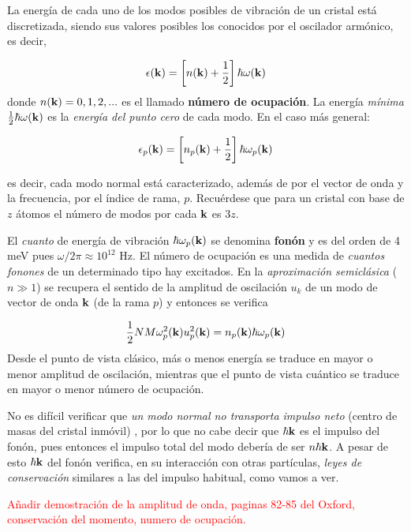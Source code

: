 La energía de cada uno de los modos posibles de vibración de un cristal está discretizada, siendo sus valores posibles los conocidos por el oscilador armónico, es decir,

\begin{equation}
    \epsilon (\mathbf{k}) = \left[ n(\mathbf{k}) + \frac{1}{2} \right] \hbar \omega (\mathbf{k})
\end{equation}
donde $n(\mathbf{k})=0,1,2,...$ es el llamado \textbf{número de ocupación}. La energía \textit{mínima} $\frac{1}{2} \hbar \omega (\mathbf{k})$ es la \textit{energía del punto cero} de cada modo. En el caso más general:
 
 \begin{mybox}
\begin{equation}
    \epsilon_p (\mathbf{k}) = \left[ n_p(\mathbf{k}) + \frac{1}{2} \right] \hbar \omega_p ( \mathbf{k})
\end{equation}
\end{mybox}
es decir, cada modo normal está caracterizado, además de por el vector de onda y la frecuencia, por el índice de rama, $p$. Recuérdese que para un cristal con base de $z$ átomos el número de modos por cada $\mathbf{k}$ es $3z$.  

El \textit{cuanto} de energía de vibración $\hbar \omega_p (\mathbf{k})$ se denomina \textbf{fonón} y es del orden de 4 meV pues $\omega/2\pi\approx 10^{12} $ Hz. El número de ocupación es una medida de \textit{cuantos fonones} de un determinado tipo hay excitados. En la \textit{aproximación semiclásica} ($n\gg 1$) se recupera el sentido de la amplitud de oscilación $u_k$ de un modo de vector de onda $\mathbf{k}$ (de la rama $p$) y entonces se verifica 

\begin{equation}
    \frac{1}{2} N M \omega_p^2 (\mathbf{k}) u_p^2 (\mathbf{k}) = n_p (\mathbf{k}) \hbar \omega_p (\mathbf{k})
\end{equation}
Desde el punto de vista clásico, más o menos energía se traduce en mayor o menor amplitud de oscilación, mientras que el punto de vista cuántico se traduce en mayor o menor número de ocupación. 

No es difícil verificar que \textit{un modo normal no transporta impulso neto} (centro de masas del cristal inmóvil) , por lo que no cabe decir que $\hbar \mathbf{k}$ es el impulso del fonón, pues entonces el impulso total del modo debería de ser $n \hbar \mathbf{k}$. A pesar de esto $\hbar \mathbf{k}$ del fonón verifica, en su interacción con otras partículas, \textit{leyes de conservación} similares a las del impulso habitual, como vamos a ver.


\begin{Anotacion}
	\textcolor{red}{Añadir demostración de la amplitud de onda, paginas 82-85 del Oxford, conservación del momento, numero de ocupación.}
\end{Anotacion}	

